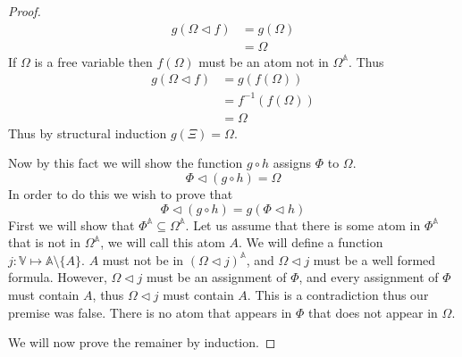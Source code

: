 \documentclass{article}
\begin{document}
\begin{proof}
\begin{align*}
   g (\Omega \lhd f)
&= g (\Omega) \tag{Definition of Assignment} \\
&= \Omega     \tag{Definition of $g$}
\end{align*}
If $\Omega$ is a free variable then $f (\Omega)$ must be an atom not in $\Omega^\mathbb{A}$.
Thus
\begin{align*}
   g (\Omega \lhd f)
&= g (f (\Omega)) \tag{Definition of Assignment} \\
&= f^{-1} (f (\Omega)) \tag{Definition of $g$} \\
&= \Omega
\end{align*}
Thus by structural induction $g(\Xi) = \Omega$.

Now by this fact we will show the function $g \circ h$ assigns $\Phi$ to $\Omega$.
\begin{equation*}
\Phi \lhd (g \circ h) = \Omega
\end{equation*}
In order to do this we wish to prove that
\begin{equation*}
\Phi \lhd (g \circ h) = g (\Phi \lhd h)
\end{equation*}
First we will show that $\Phi^\mathbb{A} \subseteq \Omega^\mathbb{A}$.
Let us assume that there is some atom in $\Phi^\mathbb{A}$ that is not in $\Omega^\mathbb{A}$, we will call this atom $A$.
We will define a function $j : \mathbb{V} \mapsto \mathbb{A} \setminus \{A\}$.
$A$ must not be in $(\Omega \lhd j)^\mathbb{A}$, and $\Omega \lhd j$ must be a well formed formula.
However, $\Omega \lhd j$ must be an assignment of $\Phi$, and every assignment of $\Phi$ must contain $A$, thus $\Omega \lhd j$ must contain $A$.
This is a contradiction thus our premise was false.
There is no atom that appears in $\Phi$ that does not appear in $\Omega$.

We will now prove the remainer by induction.


\end{proof}
\end{document}

